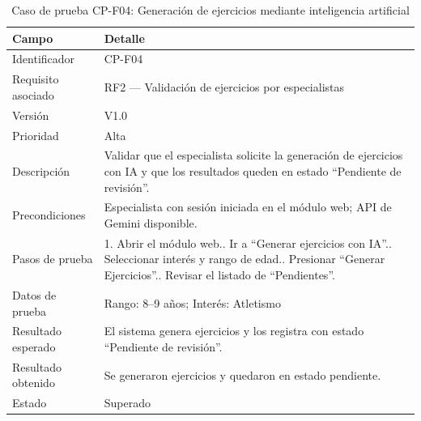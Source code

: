 				\begin{table}[H]
					\centering\small
					\caption{Caso de prueba CP-F04: Generación de ejercicios mediante inteligencia artificial}
					\label{tab:cpf04}
					\begin{tabular}{p{3cm}p{12.0cm}}
						\hline
						\textbf{Campo} & \textbf{Detalle}\\
						\hline
						Identificador & CP-F04\\
						Requisito asociado & RF2 --- Validación de ejercicios por especialistas\\
						Versión & V1.0\\
						Prioridad & Alta\\
						Descripción & Validar que el especialista solicite la generación de ejercicios con IA y que los resultados queden en estado ``Pendiente de revisión''.\\
						Precondiciones & Especialista con sesión iniciada en el módulo web; API de Gemini disponible.\\
						Pasos de prueba & 1. Abrir el módulo web.\newline 2. Ir a ``Generar ejercicios con IA''.\newline 3. Seleccionar interés y rango de edad.\newline 4. Presionar ``Generar Ejercicios''.\newline 5. Revisar el listado de ``Pendientes''.\\
						Datos de prueba & Rango: 8--9 años; Interés: Atletismo\\
						Resultado esperado & El sistema genera ejercicios y los registra con estado ``Pendiente de revisión''.\\
						Resultado obtenido & Se generaron ejercicios y quedaron en estado pendiente.\\
						Estado & Superado\\
						\hline
					\end{tabular}
				\end{table}
				\tblnote
				
